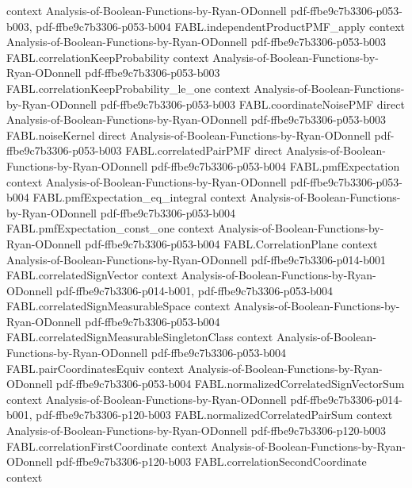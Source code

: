 \begin{theorem}
  {context}
  {Analysis-of-Boolean-Functions-by-Ryan-ODonnell}
  {pdf-ffbe9c7b3306-p053-b003,
    pdf-ffbe9c7b3306-p053-b004}
\proofstep
  {FABL.independentProductPMF_apply}
  {context}
  {Analysis-of-Boolean-Functions-by-Ryan-ODonnell}
  {pdf-ffbe9c7b3306-p053-b003}
\proofstep
  {FABL.correlationKeepProbability}
  {context}
  {Analysis-of-Boolean-Functions-by-Ryan-ODonnell}
  {pdf-ffbe9c7b3306-p053-b003}
\proofstep
  {FABL.correlationKeepProbability_le_one}
  {context}
  {Analysis-of-Boolean-Functions-by-Ryan-ODonnell}
  {pdf-ffbe9c7b3306-p053-b003}
\proofstep
  {FABL.coordinateNoisePMF}
  {direct}
  {Analysis-of-Boolean-Functions-by-Ryan-ODonnell}
  {pdf-ffbe9c7b3306-p053-b003}
\proofstep
  {FABL.noiseKernel}
  {direct}
  {Analysis-of-Boolean-Functions-by-Ryan-ODonnell}
  {pdf-ffbe9c7b3306-p053-b003}
\proofstep
  {FABL.correlatedPairPMF}
  {direct}
  {Analysis-of-Boolean-Functions-by-Ryan-ODonnell}
  {pdf-ffbe9c7b3306-p053-b004}
\proofstep
  {FABL.pmfExpectation}
  {context}
  {Analysis-of-Boolean-Functions-by-Ryan-ODonnell}
  {pdf-ffbe9c7b3306-p053-b004}
\proofstep
  {FABL.pmfExpectation_eq_integral}
  {context}
  {Analysis-of-Boolean-Functions-by-Ryan-ODonnell}
  {pdf-ffbe9c7b3306-p053-b004}
\proofstep
  {FABL.pmfExpectation_const_one}
  {context}
  {Analysis-of-Boolean-Functions-by-Ryan-ODonnell}
  {pdf-ffbe9c7b3306-p053-b004}
\proofstep
  {FABL.CorrelationPlane}
  {context}
  {Analysis-of-Boolean-Functions-by-Ryan-ODonnell}
  {pdf-ffbe9c7b3306-p014-b001}
\proofstep
  {FABL.correlatedSignVector}
  {context}
  {Analysis-of-Boolean-Functions-by-Ryan-ODonnell}
  {pdf-ffbe9c7b3306-p014-b001,
    pdf-ffbe9c7b3306-p053-b004}
\proofstep
  {FABL.correlatedSignMeasurableSpace}
  {context}
  {Analysis-of-Boolean-Functions-by-Ryan-ODonnell}
  {pdf-ffbe9c7b3306-p053-b004}
\proofstep
  {FABL.correlatedSignMeasurableSingletonClass}
  {context}
  {Analysis-of-Boolean-Functions-by-Ryan-ODonnell}
  {pdf-ffbe9c7b3306-p053-b004}
\proofstep
  {FABL.pairCoordinatesEquiv}
  {context}
  {Analysis-of-Boolean-Functions-by-Ryan-ODonnell}
  {pdf-ffbe9c7b3306-p053-b004}
\proofstep
  {FABL.normalizedCorrelatedSignVectorSum}
  {context}
  {Analysis-of-Boolean-Functions-by-Ryan-ODonnell}
  {pdf-ffbe9c7b3306-p014-b001,
    pdf-ffbe9c7b3306-p120-b003}
\proofstep
  {FABL.normalizedCorrelatedPairSum}
  {context}
  {Analysis-of-Boolean-Functions-by-Ryan-ODonnell}
  {pdf-ffbe9c7b3306-p120-b003}
\proofstep
  {FABL.correlationFirstCoordinate}
  {context}
  {Analysis-of-Boolean-Functions-by-Ryan-ODonnell}
  {pdf-ffbe9c7b3306-p120-b003}
\proofstep
  {FABL.correlationSecondCoordinate}
  {context}

\end{theorem}

